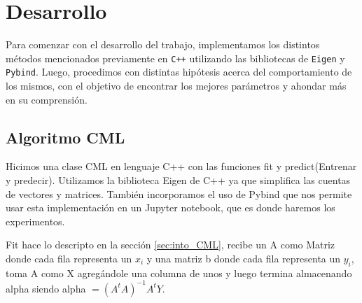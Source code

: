 \section{Desarrollo}\label{sec:desarrollo}
Para comenzar con el desarrollo del trabajo, implementamos los distintos métodos mencionados previamente en \texttt{C++} utilizando las bibliotecas de \texttt{Eigen} y \texttt{Pybind}. Luego, procedimos con distintas hipótesis acerca del comportamiento de los mismos, con el objetivo de encontrar los mejores parámetros y ahondar más en su comprensión.

\subsection{Algoritmo CML}
Hicimos una clase CML en lenguaje C++ con las funciones fit y predict(Entrenar y predecir). Utilizamos la biblioteca Eigen de C++ ya que simplifica las cuentas de vectores y matrices. También incorporamos el uso de Pybind que nos permite usar esta implementación en un Jupyter notebook, que es donde haremos los experimentos.

Fit hace lo descripto en la sección
\ref{sec:into_CML}, recibe un A como Matriz donde cada fila representa un $x_{i}$  y una matriz b donde cada fila representa un $y_{i}$, toma A como X agregándole una columna de unos y luego termina almacenando alpha siendo alpha $= (A^{t}A)^{-1}A^{t}Y$.